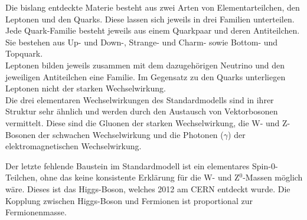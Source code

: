 
Die bislang entdeckte Materie besteht aus zwei Arten von Elementarteilchen, den Leptonen und den Quarks. Diese lassen sich jeweils in drei Familien unterteilen. Jede Quark-Familie besteht jeweils aus einem Quarkpaar und deren Antiteilchen. Sie bestehen aus Up- und Down-, Strange- und Charm- sowie Bottom- und Topquark.\\
Leptonen bilden jeweils zusammen mit dem dazugeh\"origen Neutrino und den jeweiligen Antiteilchen eine Familie. Im Gegensatz zu den Quarks unterliegen Leptonen nicht der starken Wechselwirkung.\\
Die drei elementaren Wechselwirkungen des Standardmodells sind in ihrer Struktur sehr \"ahnlich und werden durch den Austausch von Vektorbosonen vermittelt. Diese sind die Gluonen der starken Wechselwirkung, die W- und Z-Bosonen der schwachen Wechselwirkung und die Photonen ($\gamma$) der elektromagnetischen Wechselwirkung.%

Der letzte fehlende Baustein im Standardmodell ist ein elementares Spin-0-Teilchen, ohne das keine konsistente Erkl\"arung f\"ur die W- und Z$^0$-Massen m\"oglich w\"are. Dieses ist das Higgs-Boson, welches 2012 am CERN entdeckt wurde. Die Kopplung zwischen Higgs-Boson und Fermionen ist proportional zur Fermionenmasse.\\

